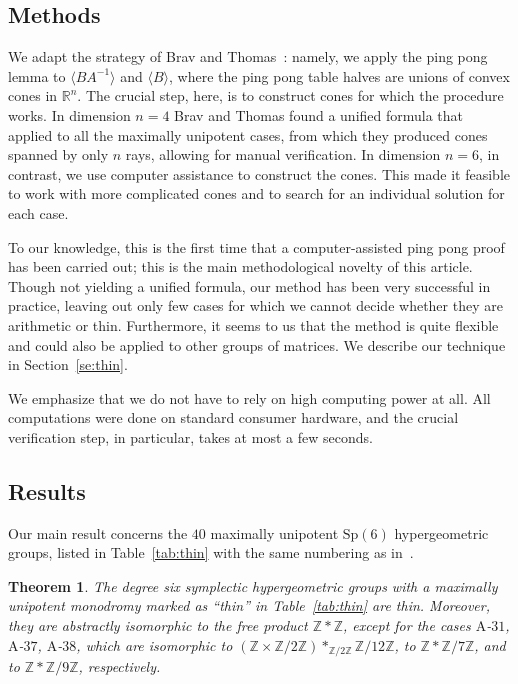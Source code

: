 \documentclass[11pt,a4paper]{amsart}
\newtheorem{thm}{Theorem}
\theoremstyle{definition}
\theoremstyle{definition}
\numberwithin{equation}{section}
\newcommand{\Sp}{\mathrm{Sp}}
\begin{document}
\subsection{Methods}\label{se:methods}
We adapt the strategy of Brav and Thomas~\cite{BT}: namely, we apply the ping pong lemma to $\langle BA^{-1}\rangle$ and $\langle B\rangle$, where the ping pong table halves are unions of convex cones in $\mathbb{R}^n$. The crucial step, here, is to construct cones for which the procedure works. In dimension $n=4$ Brav and Thomas found a unified formula that applied to all the maximally unipotent cases, from which they produced cones spanned by only $n$ rays, allowing for manual verification.
In dimension $n=6$, in contrast, we use computer assistance to construct the cones. This made it feasible to work with more complicated cones and to search for an individual solution for each case.

To our knowledge, this is the first time that a computer-assisted ping pong proof has been carried out; this is the main methodological novelty of this article. Though not yielding a unified formula, our method has been very successful in practice, leaving out only few cases for which we cannot decide whether they are arithmetic or thin. Furthermore, it seems to us that the method is quite flexible and could also be applied to other groups of matrices. We describe our technique in Section~\ref{se:thin}.

We emphasize that we do not have to rely on high computing power at all. All computations were done on standard consumer hardware, and the crucial verification step, in particular, takes at most a few seconds.

\subsection{Results}

Our main result concerns the $40$ maximally unipotent $\Sp(6)$ hypergeometric groups, listed in Table~\ref{tab:thin} with the same numbering as in~\cite[Table A]{bdss}.

\begin{thm}\label{thm:total}
The degree six symplectic hypergeometric groups with a maximally unipotent monodromy marked as ``thin'' in Table~\ref{tab:thin} are thin. Moreover, they are abstractly isomorphic to the free product $\mathbb{Z}\ast\mathbb{Z}$, except for the cases $\mathrm{A}$-$31$, $\mathrm{A}$-$37$, $\mathrm{A}$-$38$, which are isomorphic to $(\mathbb{Z}\times\mathbb{Z}/2\mathbb{Z})\ast_{\mathbb{Z}/2\mathbb{Z}}\mathbb{Z}/12\mathbb{Z}$, to $\mathbb{Z}\ast\mathbb{Z}/7\mathbb{Z}$, and to $\mathbb{Z}\ast \mathbb{Z}/9\mathbb{Z}$, respectively.
\end{thm}
\end{document}
